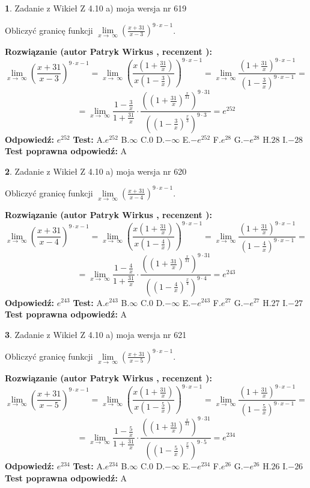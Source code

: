 \documentclass[12pt, a4paper]{article}
\theoremstyle{definition} %
\newtheorem{zad}{}
\newcommand{\zadStart}[1]{\begin{zad}#1\newline}
\newcommand{\zadStop}{\end{zad}}
\newcommand{\rozwStart}[2]{\noindent \textbf{Rozwiązanie (autor #1 , recenzent #2): }\newline}
\newcommand{\rozwStop}{\newline}
\newcommand{\odpStart}{\noindent \textbf{Odpowiedź:}\newline}
\newcommand{\odpStop}{\newline}
\newcommand{\testStart}{\noindent \textbf{Test:}\newline}
\newcommand{\testStop}{\newline}
\newcommand{\kluczStart}{\noindent \textbf{Test poprawna odpowiedź:}\newline}
\newcommand{\kluczStop}{\newline}
\begin{document}
\zadStart{Zadanie z Wikieł Z 4.10 a) moja wersja nr 619}

Obliczyć granicę funkcji  $\lim\limits_{x\to\ \infty}(\frac{x+31}{x-3})^{9\cdot x-1}$.
\zadStop
\rozwStart{Patryk Wirkus}{}
$$\lim\limits_{x\to\ \infty}(\frac{x+31}{x-3})^{9\cdot x-1} = \lim\limits_{x\to\ \infty}(\frac{x(1+\frac{31}{x})}{x(1-\frac{3}{x})})^{9\cdot x-1}=\lim\limits_{x\to\ \infty}\frac{(1+\frac{31}{x})^{9\cdot x-1}}{(1-\frac{3}{x})^{9\cdot x-1}}=$$
$$=\lim\limits_{x\to\ \infty}\frac{1-\frac{3}{x}}{1+\frac{31}{x}}\cdot\frac{((1+\frac{31}{x})^{\frac{x}{31}})^{9\cdot31}}{((1-\frac{3}{x})^{\frac{x}{3}})^{9\cdot3}}=e^{252}$$
\rozwStop
\odpStart
$e^{252}$
\odpStop
\testStart
A.$e^{252}$ B.$\infty$ C.$0$ D.$-\infty$ E.$-e^{252}$
F.$e^{28}$ G.$-e^{28}$
H.$28$
I.$-28$
\testStop
\kluczStart
A
\kluczStop



\zadStart{Zadanie z Wikieł Z 4.10 a) moja wersja nr 620}

Obliczyć granicę funkcji  $\lim\limits_{x\to\ \infty}(\frac{x+31}{x-4})^{9\cdot x-1}$.
\zadStop
\rozwStart{Patryk Wirkus}{}
$$\lim\limits_{x\to\ \infty}(\frac{x+31}{x-4})^{9\cdot x-1} = \lim\limits_{x\to\ \infty}(\frac{x(1+\frac{31}{x})}{x(1-\frac{4}{x})})^{9\cdot x-1}=\lim\limits_{x\to\ \infty}\frac{(1+\frac{31}{x})^{9\cdot x-1}}{(1-\frac{4}{x})^{9\cdot x-1}}=$$
$$=\lim\limits_{x\to\ \infty}\frac{1-\frac{4}{x}}{1+\frac{31}{x}}\cdot\frac{((1+\frac{31}{x})^{\frac{x}{31}})^{9\cdot31}}{((1-\frac{4}{x})^{\frac{x}{4}})^{9\cdot4}}=e^{243}$$
\rozwStop
\odpStart
$e^{243}$
\odpStop
\testStart
A.$e^{243}$ B.$\infty$ C.$0$ D.$-\infty$ E.$-e^{243}$
F.$e^{27}$ G.$-e^{27}$
H.$27$
I.$-27$
\testStop
\kluczStart
A
\kluczStop



\zadStart{Zadanie z Wikieł Z 4.10 a) moja wersja nr 621}

Obliczyć granicę funkcji  $\lim\limits_{x\to\ \infty}(\frac{x+31}{x-5})^{9\cdot x-1}$.
\zadStop
\rozwStart{Patryk Wirkus}{}
$$\lim\limits_{x\to\ \infty}(\frac{x+31}{x-5})^{9\cdot x-1} = \lim\limits_{x\to\ \infty}(\frac{x(1+\frac{31}{x})}{x(1-\frac{5}{x})})^{9\cdot x-1}=\lim\limits_{x\to\ \infty}\frac{(1+\frac{31}{x})^{9\cdot x-1}}{(1-\frac{5}{x})^{9\cdot x-1}}=$$
$$=\lim\limits_{x\to\ \infty}\frac{1-\frac{5}{x}}{1+\frac{31}{x}}\cdot\frac{((1+\frac{31}{x})^{\frac{x}{31}})^{9\cdot31}}{((1-\frac{5}{x})^{\frac{x}{5}})^{9\cdot5}}=e^{234}$$
\rozwStop
\odpStart
$e^{234}$
\odpStop
\testStart
A.$e^{234}$ B.$\infty$ C.$0$ D.$-\infty$ E.$-e^{234}$
F.$e^{26}$ G.$-e^{26}$
H.$26$
I.$-26$
\testStop
\kluczStart
A
\kluczStop
\end{document}
